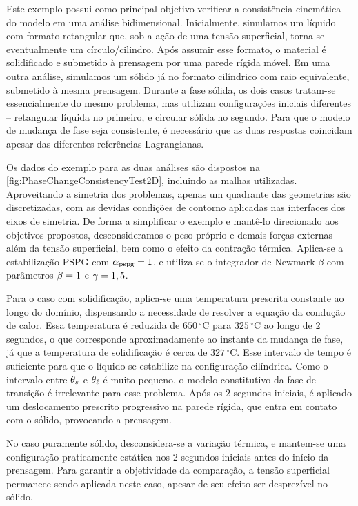 \documentclass[Tese.tex]{subfiles}
\begin{document}
Este exemplo possui como principal objetivo verificar a consistência cinemática do modelo em uma análise bidimensional. Inicialmente, simulamos um líquido com formato retangular que, sob a ação de uma tensão superficial, torna-se eventualmente um círculo/cilindro. Após assumir esse formato, o material é solidificado e submetido à prensagem por uma parede rígida móvel. Em uma outra análise, simulamos um sólido já no formato cilíndrico com raio equivalente, submetido à mesma prensagem. Durante a fase sólida, os dois casos tratam-se essencialmente do mesmo problema, mas utilizam configurações iniciais diferentes -- retangular líquida no primeiro, e circular sólida no segundo. Para que o modelo de mudança de fase seja consistente, é necessário que as duas respostas coincidam apesar das diferentes referências Lagrangianas.

Os dados do exemplo para as duas análises são dispostos na \cref{fig:PhaseChangeConsistencyTest2D}, incluindo as malhas utilizadas. Aproveitando a simetria dos problemas, apenas um quadrante das geometrias são discretizadas, com as devidas condições de contorno aplicadas nas interfaces dos eixos de simetria. De forma a simplificar o exemplo e mantê-lo direcionado aos objetivos propostos, desconsideramos o peso próprio e demais forças externas além da tensão superficial, bem como o efeito da contração térmica. Aplica-se a estabilização PSPG com $\alpha_\text{pspg} = 1$, e utiliza-se o integrador de Newmark-$\beta$ com parâmetros $\beta = 1$ e $\gamma = 1,5$.

Para o caso com solidificação, aplica-se uma temperatura prescrita constante ao longo do domínio, dispensando a necessidade de resolver a equação da condução de calor. Essa temperatura é reduzida de $650\,^{\circ}$C para $325\,^{\circ}$C ao longo de $2$ segundos, o que corresponde aproximadamente ao instante da mudança de fase, já que a temperatura de solidificação é cerca de $327\,^{\circ}$C. Esse intervalo de tempo é suficiente para que o líquido se estabilize na configuração cilíndrica. Como o intervalo entre $\theta_s$ e $\theta_\ell$ é muito pequeno, o modelo constitutivo da fase de transição é irrelevante para esse problema. Após os $2$ segundos iniciais, é aplicado um deslocamento prescrito progressivo na parede rígida, que entra em contato com o sólido, provocando a prensagem. 

No caso puramente sólido, desconsidera-se a variação térmica, e mantem-se uma configuração praticamente estática nos $2$ segundos iniciais antes do início da prensagem. Para garantir a objetividade da comparação, a tensão superficial permanece sendo aplicada neste caso, apesar de seu efeito ser desprezível no sólido.
\end{document}
